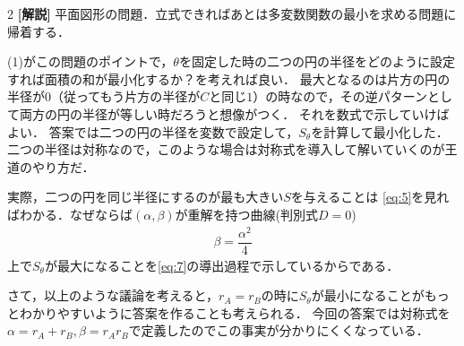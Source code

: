 \documentclass[../../main.tex]{subfiles}
\begin{document}
\begin{multicols}{2}
  {\bf [解説]}
  平面図形の問題．立式できればあとは多変数関数の最小を求める問題に帰着する．

  (1)がこの問題のポイントで，$\theta$を固定した時の二つの円の半径をどのように設定すれば面積の和が最小化するか？を考えれば良い．
  最大となるのは片方の円の半径が$0$（従ってもう片方の半径が$C$と同じ$1$）の時なので，その逆パターンとして両方の円の半径が等しい時だろうと想像がつく．
  それを数式で示していけばよい．
  答案では二つの円の半径を変数で設定して，$S_{\theta}$を計算して最小化した．
  二つの半径は対称なので，このような場合は対称式を導入して解いていくのが王道のやり方だ．

  実際，二つの円を同じ半径にするのが最も大きい$S$を与えることは
  \cref{eq:5}を見ればわかる．なぜならば$(\alpha,\beta)$が重解を持つ曲線(判別式$D=0$)
  \begin{align}
    \beta = \dfrac{\alpha^2}{4}
  \end{align}
  上で$S_{\theta}$が最大になることを\cref{eq:7}の導出過程で示しているからである．

  さて，以上のような議論を考えると，$r_{A}=r_{B}$の時に$S_{\theta}$が最小になることがもっとわかりやすいように答案を作ることも考えられる．
  今回の答案では対称式を$\alpha=r_{A}+r_{B},\beta=r_{A}r_{B}$で定義したのでこの事実が分かりにくくなっている．


\end{multicols}
\end{document}
